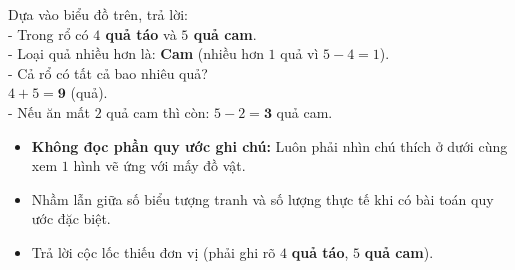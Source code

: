\documentclass[10pt,a4paper]{article}
\begin{document}
\vspace{-1.5mm}
\noindent
\begin{minipage}[t]{0.49\textwidth}\vspace{0pt}
\begin{tcolorbox}[
  enhanced,
  colback=green!4!white,
  colframe=green!60!black,
  arc=2mm, boxrule=0.8pt,
  left=2mm, right=2mm, top=1.8mm, bottom=1.8mm,
  title={\footnotesize\bfseries\color{white}\faCheckCircle\ 4. Câu hỏi khai thác biểu đồ mẫu}
]
{\footnotesize
Dựa vào biểu đồ trên, trả lời:\\
- Trong rổ có \textbf{$4$ quả táo} và \textbf{$5$ quả cam}.\\
- Loại quả nhiều hơn là: \textbf{Cam} (nhiều hơn $1$ quả vì $5 - 4 = 1$).\\
- Cả rổ có tất cả bao nhiêu quả?\\
$4 + 5 = \mathbf{9}$ (quả).\\
- Nếu ăn mất $2$ quả cam thì còn: $5 - 2 = \mathbf{3}$ quả cam.
}
\end{tcolorbox}
\end{minipage}
\hfill
\begin{minipage}[t]{0.49\textwidth}\vspace{0pt}
\begin{tcolorbox}[
  enhanced,
  colback=rose!4!white,
  colframe=rose!70!black,
  arc=2mm, boxrule=0.8pt,
  left=2mm, right=2mm, top=1.8mm, bottom=1.8mm,
  title={\footnotesize\bfseries\color{white}\faExclamationTriangle\ 5. Cạm bẫy học sinh cần nhớ}
]
{\footnotesize
\begin{itemize}\setlength{\itemsep}{1.5pt}\setlength{\leftskip}{-2.5mm}
  \item \textbf{Không đọc phần quy ước ghi chú:} Luôn phải nhìn chú thích ở dưới cùng xem $1$ hình vẽ ứng với mấy đồ vật.
  \item Nhầm lẫn giữa số biểu tượng tranh và số lượng thực tế khi có bài toán quy ước đặc biệt.
  \item Trả lời cộc lốc thiếu đơn vị (phải ghi rõ $4$ \textbf{quả táo}, $5$ \textbf{quả cam}).
\end{itemize}
}
\end{tcolorbox}
\end{minipage}
\end{document}
